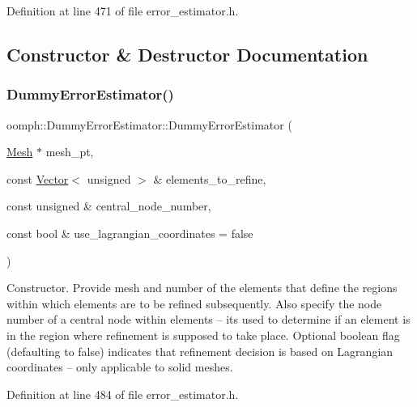 Definition at line 471 of file error\+\_\+estimator.\+h.



\subsection{Constructor \& Destructor Documentation}
\mbox{\label{classoomph_1_1DummyErrorEstimator_a32f15a763f800e451cc9ddec074cd25c}} 
\subsubsection{\texorpdfstring{Dummy\+Error\+Estimator()}{DummyErrorEstimator()}\hspace{0.1cm}{\footnotesize\ttfamily [1/3]}}
{\footnotesize\ttfamily oomph\+::\+Dummy\+Error\+Estimator\+::\+Dummy\+Error\+Estimator (\begin{DoxyParamCaption}\item[{\hyperlink{classoomph_1_1Mesh}{Mesh} $\ast$}]{mesh\+\_\+pt,  }\item[{const \hyperlink{classoomph_1_1Vector}{Vector}$<$ unsigned $>$ \&}]{elements\+\_\+to\+\_\+refine,  }\item[{const unsigned \&}]{central\+\_\+node\+\_\+number,  }\item[{const bool \&}]{use\+\_\+lagrangian\+\_\+coordinates = {\ttfamily false} }\end{DoxyParamCaption})\hspace{0.3cm}{\ttfamily [inline]}}



Constructor. Provide mesh and number of the elements that define the regions within which elements are to be refined subsequently. Also specify the node number of a central node within elements -- it\textquotesingle{}s used to determine if an element is in the region where refinement is supposed to take place. Optional boolean flag (defaulting to false) indicates that refinement decision is based on Lagrangian coordinates -- only applicable to solid meshes. 



Definition at line 484 of file error\+\_\+estimator.\+h.



